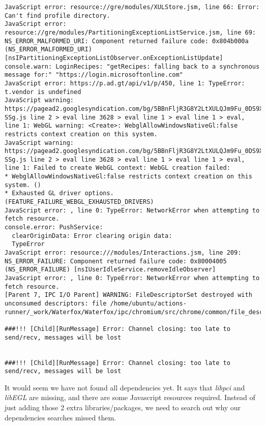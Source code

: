 \documentclass[a4paper]{article}  %
\begin{document}
\begin{tcolorbox}
\begin{verbatim}
JavaScript error: resource://gre/modules/XULStore.jsm, line 66: Error: Can't find profile directory.
JavaScript error: resource://gre/modules/PartitioningExceptionListService.jsm, line 69: NS_ERROR_MALFORMED_URI: Component returned failure code: 0x804b000a (NS_ERROR_MALFORMED_URI) [nsIPartitioningExceptionListObserver.onExceptionListUpdate]
console.warn: LoginRecipes: "getRecipes: falling back to a synchronous message for:" "https://login.microsoftonline.com"
JavaScript error: https://p.ad.gt/api/v1/p/450, line 1: TypeError: t.vendor is undefined
JavaScript warning: https://pagead2.googlesyndication.com/bg/5BBnFljR3G8Y2LtXULQJm9Fu_0DS9XrGSjZ8CuJ-SSg.js line 2 > eval line 3628 > eval line 1 > eval line 1 > eval, line 1: WebGL warning: <Create>: WebglAllowWindowsNativeGl:false restricts context creation on this system.
JavaScript warning: https://pagead2.googlesyndication.com/bg/5BBnFljR3G8Y2LtXULQJm9Fu_0DS9XrGSjZ8CuJ-SSg.js line 2 > eval line 3628 > eval line 1 > eval line 1 > eval, line 1: Failed to create WebGL context: WebGL creation failed: 
* WebglAllowWindowsNativeGl:false restricts context creation on this system. ()
* Exhausted GL driver options. (FEATURE_FAILURE_WEBGL_EXHAUSTED_DRIVERS)
JavaScript error: , line 0: TypeError: NetworkError when attempting to fetch resource.
console.error: PushService: 
  clearOriginData: Error clearing origin data:
  TypeError
JavaScript error: resource:///modules/Interactions.jsm, line 209: NS_ERROR_FAILURE: Component returned failure code: 0x80004005 (NS_ERROR_FAILURE) [nsIUserIdleService.removeIdleObserver]
JavaScript error: , line 0: TypeError: NetworkError when attempting to fetch resource.
[Parent 7, IPC I/O Parent] WARNING: FileDescriptorSet destroyed with unconsumed descriptors: file /home/ubuntu/actions-runner/_work/Waterfox/Waterfox/ipc/chromium/src/chrome/common/file_descriptor_set_posix.cc:19

###!!! [Child][RunMessage] Error: Channel closing: too late to send/recv, messages will be lost


###!!! [Child][RunMessage] Error: Channel closing: too late to send/recv, messages will be lost

\end{verbatim}
\end{tcolorbox}
It would seem we have not found all dependencies yet. It says that {\em libpci} and {\em libEGL} are missing, and there are some Javascript resources required.
Instead of just adding those 2 extra libraries/packages, we need to search out why our dependencies searches missed them.
\end{document}
